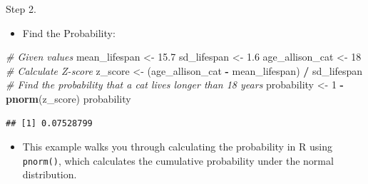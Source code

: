 \documentclass[
  ignorenonframetext,
]{beamer}
\newenvironment{Shaded}{\begin{snugshade}}{\end{snugshade}}
\newcommand{\CommentTok}[1]{\textcolor[rgb]{0.56,0.35,0.01}{\textit{#1}}}
\newcommand{\DecValTok}[1]{\textcolor[rgb]{0.00,0.00,0.81}{#1}}
\newcommand{\FloatTok}[1]{\textcolor[rgb]{0.00,0.00,0.81}{#1}}
\newcommand{\FunctionTok}[1]{\textcolor[rgb]{0.13,0.29,0.53}{\textbf{#1}}}
\newcommand{\NormalTok}[1]{#1}
\newcommand{\OtherTok}[1]{\textcolor[rgb]{0.56,0.35,0.01}{#1}}
\newcommand{\SpecialCharTok}[1]{\textcolor[rgb]{0.81,0.36,0.00}{\textbf{#1}}}
\providecommand{\tightlist}{%
  \setlength{\itemsep}{0pt}\setlength{\parskip}{0pt}}
\begin{document}
\begin{frame}[fragile]{Step 2.}
\label{step-2.-1}
\begin{itemize}
\tightlist
\item
  Find the Probability:
\end{itemize}

\begin{Shaded}
\begin{Highlighting}[]
\CommentTok{\# Given values}
\NormalTok{mean\_lifespan }\OtherTok{\textless{}{-}} \FloatTok{15.7}
\NormalTok{sd\_lifespan }\OtherTok{\textless{}{-}} \FloatTok{1.6}
\NormalTok{age\_allison\_cat }\OtherTok{\textless{}{-}} \DecValTok{18}
\CommentTok{\# Calculate Z{-}score}
\NormalTok{z\_score }\OtherTok{\textless{}{-}}\NormalTok{ (age\_allison\_cat }\SpecialCharTok{{-}}\NormalTok{ mean\_lifespan) }\SpecialCharTok{/}\NormalTok{ sd\_lifespan}
\CommentTok{\# Find the probability that a cat lives longer than 18 years}
\NormalTok{probability }\OtherTok{\textless{}{-}} \DecValTok{1} \SpecialCharTok{{-}} \FunctionTok{pnorm}\NormalTok{(z\_score)}
\NormalTok{probability}
\end{Highlighting}
\end{Shaded}

\begin{verbatim}
## [1] 0.07528799
\end{verbatim}

\begin{itemize}
\tightlist
\item
  This example walks you through calculating the probability in R using
  \texttt{pnorm()}, which calculates the cumulative probability under
  the normal distribution.
\end{itemize}
\end{frame}
\end{document}
